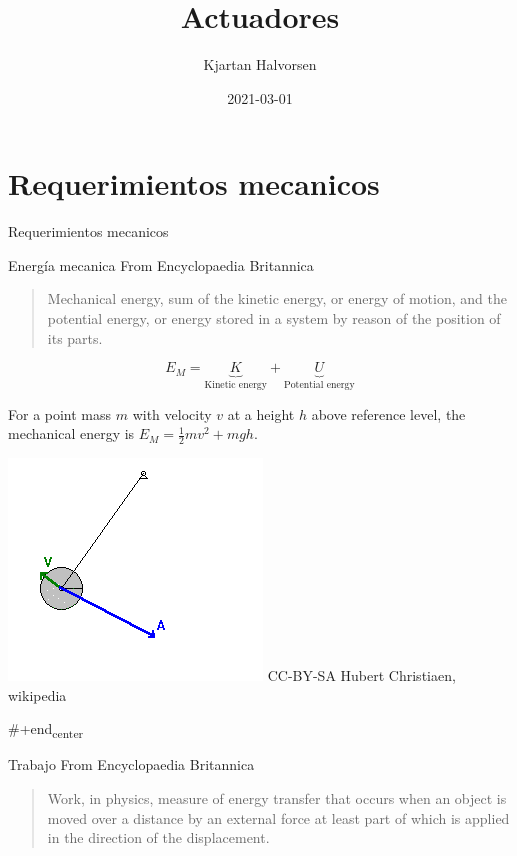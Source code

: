 \documentclass[presentation,aspectratio=169]{beamer}
\author{Kjartan Halvorsen}
\date{2021-03-01}
\title{Actuadores}
\begin{document}
\maketitle

\section{Requerimientos mecanicos}
\label{sec:org54ca95e}

\begin{frame}[label={sec:orgbe1f6cb}]{Requerimientos mecanicos}
\end{frame}
\begin{frame}[label={sec:org8412c57}]{Energía mecanica}
From Encyclopaedia Britannica
\begin{quote}
\alert{Mechanical energy}, sum of the kinetic energy, or energy of motion, and the potential energy, or energy stored in a system by reason of the position of its parts. 
\end{quote}

\[ E_M = \underbrace{K}_{\text{Kinetic energy}} + \underbrace{U}_{\text{Potential energy}}\]

For a point mass \(m\) with velocity \(v\) at a height \(h\) above reference level, the mechanical energy is \(E_M = \frac{1}{2}mv^2 + mgh\).

\begin{center}
\includegraphics[height=0.3\textheight]{../../figures/pendulum.png}
{\footnotesize CC-BY-SA Hubert Christiaen, wikipedia}
\end{center}


\#+end\textsubscript{center}
\end{frame}
\begin{frame}[label={sec:orgd3b5f93}]{Trabajo}
From Encyclopaedia Britannica
\begin{quote}
\alert{Work}, in physics, measure of \alert{energy transfer} that occurs when an object is \alert{moved over a distance} by an \alert{external force} at least part of which is applied in the direction of the displacement.
\end{quote}
\end{frame}
\end{document}
